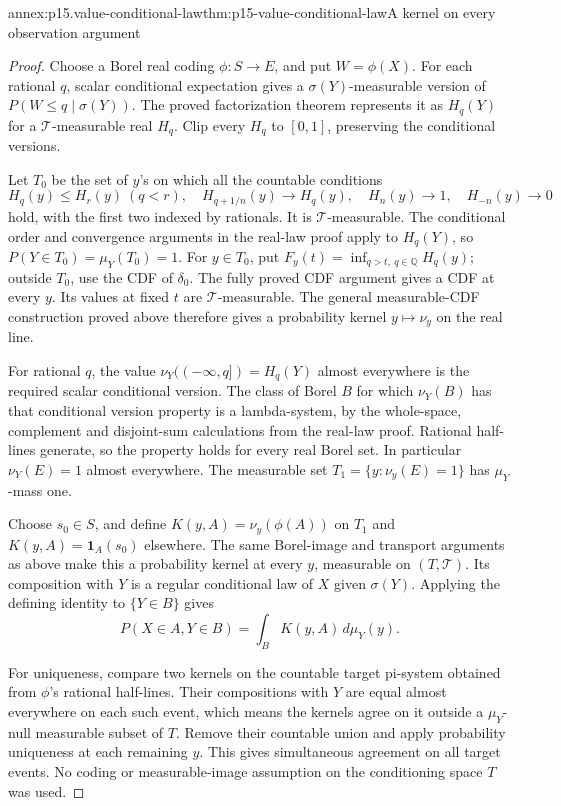 \begin{annexitem}{annex:p15.value-conditional-law}{thm:p15-value-conditional-law}{A kernel on every observation argument}
\begin{proof}
Choose a Borel real coding \(\phi:S\to E\), and put \(W=\phi(X)\).
For each rational \(q\), scalar conditional expectation gives
a \(\sigma(Y)\)-measurable version of \(P(W\leq q\mid\sigma(Y))\).
The proved factorization theorem represents it as \(H_q(Y)\)
for a \(\mathcal T\)-measurable real \(H_q\).
Clip every \(H_q\) to \([0,1]\), preserving the conditional versions.

Let \(T_0\) be the set of \(y\)'s on which all the countable
conditions
\[
 H_q(y)\leq H_r(y)\ (q<r),\quad
 H_{q+1/n}(y)\to H_q(y),\quad
 H_n(y)\to1,\quad H_{-n}(y)\to0
\]
hold, with the first two indexed by rationals.
It is \(\mathcal T\)-measurable. The conditional order and
convergence arguments in the real-law proof apply to \(H_q(Y)\),
so \(P(Y\in T_0)=\mu_Y(T_0)=1\).
For \(y\in T_0\), put
\(F_y(t)=\inf_{q>t,\ q\in\mathbb Q}H_q(y)\);
outside \(T_0\), use the CDF of \(\delta_0\).
The fully proved CDF argument gives a CDF at every \(y\).
Its values at fixed \(t\) are \(\mathcal T\)-measurable.
The general measurable-CDF construction proved above therefore
gives a probability kernel \(y\mapsto\nu_y\) on the real line.

For rational \(q\), the value \(\nu_Y((-\infty,q])=H_q(Y)\)
almost everywhere is the required scalar conditional version.
The class of Borel \(B\) for which \(\nu_Y(B)\) has that
conditional version property is a lambda-system, by the
whole-space, complement and disjoint-sum calculations from the
real-law proof. Rational half-lines generate, so the property
holds for every real Borel set.
In particular \(\nu_Y(E)=1\) almost everywhere.
The measurable set \(T_1=\{y:\nu_y(E)=1\}\) has \(\mu_Y\)-mass one.

Choose \(s_0\in S\), and define \(K(y,A)=\nu_y(\phi(A))\) on
\(T_1\) and \(K(y,A)=\mathbf1_A(s_0)\) elsewhere.
The same Borel-image and transport arguments as above make this
a probability kernel at every \(y\), measurable on \((T,\mathcal T)\).
Its composition with \(Y\) is a regular conditional law of \(X\)
given \(\sigma(Y)\). Applying the defining identity to
\(\{Y\in B\}\) gives
\[
                    P(X\in A,Y\in B)=\int_BK(y,A)\,d\mu_Y(y).
\]

For uniqueness, compare two kernels on the countable target
pi-system obtained from \(\phi\)'s rational half-lines.
Their compositions with \(Y\) are equal almost everywhere on
each such event, which means the kernels agree on it outside
a \(\mu_Y\)-null measurable subset of \(T\).
Remove their countable union and apply probability uniqueness
at each remaining \(y\). This gives simultaneous agreement on
all target events. No coding or measurable-image assumption on
the conditioning space \(T\) was used.
\end{proof}
\end{annexitem}

